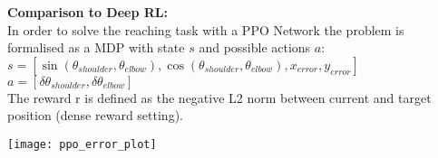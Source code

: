 \documentclass[portrait,final,a0paper,fontscale=0.374]{baposter}
\begin{document}
\begin{poster}
{\begin{adjustbox}{minipage=0.95\textwidth, margin=5pt, center}
\begin{minipage}[t]{0.725\textwidth}
			\textbf{Comparison to Deep RL:}\\[2pt]
			In order to solve the reaching task with a PPO Network \parencite{} the problem is formalised as a MDP with state $s$ and possible actions $a$:\\[5pt]
				$s = [\sin(\theta_{shoulder}, \theta_{elbow}),  \cos(\theta_{shoulder}, \theta_{elbow}), x_{error}, y_{error}]$\\
				$a = [\delta\theta_{shoulder}, \delta\theta_{elbow}]$\\[5pt]
			The reward r is defined as the negative L2 norm between current and target position (dense reward setting).
			\begin{center}
				\texttt{[image: ppo\_error\_plot]}
			\end{center}
		\end{minipage}
		\hfill
	\end{adjustbox}

}






\end{poster}
\end{document}
